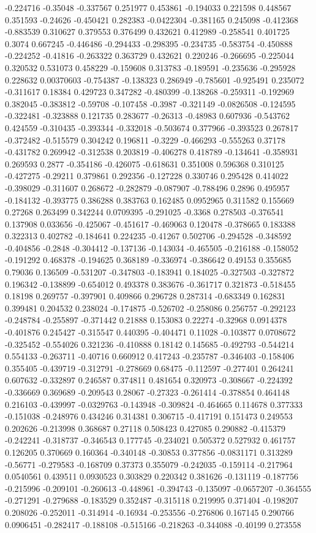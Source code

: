 -0.224716 -0.35048 -0.337567 0.251977 0.453861 -0.194033 0.221598 0.448567 0.351593 -0.24626 -0.450421 0.282383 -0.0422304 -0.381165 0.245098 -0.412368 -0.883539 0.310627 0.379553 0.376499 0.432621 0.412989 -0.258541 0.401725 0.3074 0.667245 -0.446486 -0.294433 -0.298395 -0.234735 -0.583754 -0.450888 -0.224252 -0.41816 -0.263322 0.363729 0.432621 0.220246 -0.266695 -0.225044 0.320532 0.531073 0.458229 -0.159608 0.313783 -0.189591 -0.235636 -0.295928 0.228632 0.00370603 -0.754387 -0.138323 0.286949 -0.785601 -0.925491 0.235072 -0.311617 0.18384 0.429723 0.347282 -0.480399 -0.138268 -0.259311 -0.192969 0.382045 -0.383812 -0.59708 -0.107458 -0.3987 -0.321149 -0.0826508 -0.124595 -0.322481 -0.323888 0.121735 0.283677 -0.26313 -0.48983 0.607936 -0.543762 0.424559 -0.310435 -0.393344 -0.332018 -0.503674 0.377966 -0.393523 0.267817 -0.372482 -0.515579 0.304242 0.196811 -0.3229 -0.466293 -0.555263 0.37178 -0.431782 0.269942 -0.312538 0.203819 -0.406278 0.418789 -0.134641 -0.358931 0.269593 0.2877 -0.354186 -0.426075 -0.618631 0.351008 0.596368 0.310125 -0.427275 -0.29211 0.379861 0.292356 -0.127228 0.330746 0.295428 0.414022 -0.398029 -0.311607 0.268672 -0.282879 -0.087907 -0.788496 0.2896 0.495957 -0.184132 -0.393775 0.386288 0.383763 0.162485 0.0952965 0.311582 0.155669 0.27268 0.263499 0.342244 0.0709395 -0.291025 -0.3368 0.278503 -0.376541 0.137908 0.033656 -0.425067 -0.451617 -0.469063 0.120478 -0.378665 0.183388 0.322313 0.402782 -0.184641 0.224235 -0.41267 0.502706 -0.294528 -0.348592 -0.404856 -0.2848 -0.304412 -0.137136 -0.143034 -0.465505 -0.216188 -0.158052 -0.191292 0.468378 -0.194625 0.368189 -0.336974 -0.386642 0.49153 0.355685 0.79036 0.136509 -0.531207 -0.347803 -0.183941 0.184025 -0.327503 -0.327872 0.196342 -0.138899 -0.654012 0.493378 0.383676 -0.361717 0.321873 -0.518455 0.18198 0.269757 -0.397901 0.409866 0.296728 0.287314 -0.683349 0.162831 0.399481 0.204532 0.238024 -0.174875 -0.526702 -0.258086 0.256757 -0.292123 -0.248784 -0.255897 -0.371442 0.21888 0.153083 0.22274 -0.32968 0.0914378 -0.401876 0.245427 -0.315547 0.440395 -0.404471 0.11028 -0.103877 0.0708672 -0.325452 -0.554026 0.321236 -0.410888 0.18142 0.145685 -0.492793 -0.544214 0.554133 -0.263711 -0.40716 0.660912 0.417243 -0.235787 -0.346403 -0.158406 0.355405 -0.439719 -0.312791 -0.278669 0.68475 -0.112597 -0.277401 0.264241 0.607632 -0.332897 0.246587 0.374811 0.481654 0.320973 -0.308667 -0.224392 -0.336669 0.369689 -0.209543 0.28067 -0.27323 -0.261414 -0.378854 0.464148 0.216103 -0.439997 -0.0329763 -0.143948 -0.309824 -0.464665 0.114678 0.377333 -0.151038 -0.248976 0.434246 0.314381 0.306715 -0.417191 0.151473 0.249553 0.202626 -0.213998 0.368687 0.27118 0.508423 0.427085 0.290882 -0.415379 -0.242241 -0.318737 -0.346543 0.177745 -0.234021 0.505372 0.527932 0.461757 0.126205 0.370669 0.160364 -0.340148 -0.30853 0.377856 -0.0831171 0.313289 -0.56771 -0.279583 -0.168709 0.37373 0.355079 -0.242035 -0.159114 -0.217964 0.0540561 0.439511 0.0930523 0.303829 0.220342 0.381626 -0.131119 -0.187756 -0.215996 -0.209101 -0.260613 -0.448961 -0.394743 -0.135097 -0.0657207 -0.364555 -0.271291 -0.279688 -0.183529 0.352487 -0.315118 0.219995 0.371404 -0.198207 0.208026 -0.252011 -0.314914 -0.16934 -0.253556 -0.276806 0.167145 0.290766 0.0906451 -0.282417 -0.188108 -0.515166 -0.218263 -0.344088 -0.40199 0.273558 